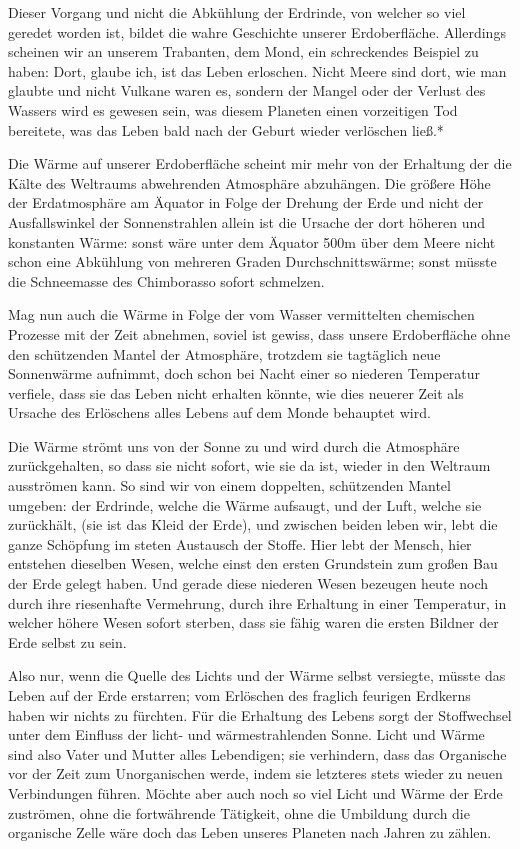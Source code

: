 \documentclass[a4paper, 12pt, oneside]{article}
\begin{document}
Dieser Vorgang und nicht die Abkühlung der Erdrinde, von welcher so viel geredet worden ist, bildet die wahre Geschichte unserer Erdoberfläche. Allerdings scheinen wir an unserem Trabanten, dem Mond, ein schreckendes Beispiel zu haben: Dort, glaube ich, ist das Leben erloschen. Nicht Meere sind dort, wie man glaubte und nicht Vulkane waren es, sondern der Mangel oder der Verlust des Wassers wird es gewesen sein, was diesem Planeten einen vorzeitigen Tod bereitete, was das Leben bald nach der Geburt wieder verlöschen ließ.*

Die Wärme auf unserer Erdoberfläche scheint mir mehr von der Erhaltung der die Kälte des Weltraums abwehrenden Atmosphäre abzuhängen. Die größere Höhe der Erdatmosphäre am Äquator in Folge der Drehung der Erde und nicht der Ausfallswinkel der Sonnenstrahlen allein ist die Ursache der dort höheren und konstanten Wärme: sonst wäre unter dem Äquator 500m über dem Meere nicht schon eine Abkühlung von mehreren Graden Durchschnittswärme; sonst müsste die Schneemasse des Chimborasso sofort schmelzen.

Mag nun auch die Wärme in Folge der vom Wasser vermittelten chemischen Prozesse mit der Zeit abnehmen, soviel ist gewiss, dass unsere Erdoberfläche ohne den schützenden Mantel der Atmosphäre, trotzdem sie tagtäglich neue Sonnenwärme aufnimmt, doch schon bei Nacht einer so niederen Temperatur verfiele, dass sie das Leben nicht erhalten könnte, wie dies neuerer Zeit als Ursache des Erlöschens alles Lebens auf dem Monde behauptet wird.

Die Wärme strömt uns von der Sonne zu und wird durch die Atmosphäre zurückgehalten, so dass sie nicht sofort, wie sie da ist, wieder in den Weltraum ausströmen kann. So sind wir von einem doppelten, schützenden Mantel umgeben: der Erdrinde, welche die Wärme aufsaugt, und der Luft, welche sie zurückhält, (sie ist das Kleid der Erde), und zwischen beiden leben wir, lebt die ganze Schöpfung im steten Austausch der Stoffe. Hier lebt der Mensch, hier entstehen dieselben Wesen, welche einst den ersten Grundstein zum großen Bau der Erde gelegt haben. Und gerade diese niederen Wesen bezeugen heute noch durch ihre riesenhafte Vermehrung, durch ihre Erhaltung in einer Temperatur, in welcher höhere Wesen sofort sterben, dass sie fähig waren die ersten Bildner der Erde selbst zu sein.

Also nur, wenn die Quelle des Lichts und der Wärme selbst versiegte, müsste das Leben auf der Erde erstarren; vom Erlöschen des fraglich feurigen Erdkerns haben wir nichts zu fürchten. Für die Erhaltung des Lebens sorgt der Stoffwechsel unter dem Einfluss der licht- und wärmestrahlenden Sonne. Licht und Wärme sind also Vater und Mutter alles Lebendigen; sie verhindern, dass das Organische vor der Zeit zum Unorganischen werde, indem sie letzteres stets wieder zu neuen Verbindungen führen. Möchte aber auch noch so viel Licht und Wärme der Erde zuströmen, ohne die fortwährende Tätigkeit, ohne die Umbildung durch die organische Zelle wäre doch das Leben unseres Planeten nach Jahren zu zählen.
\end{document}
